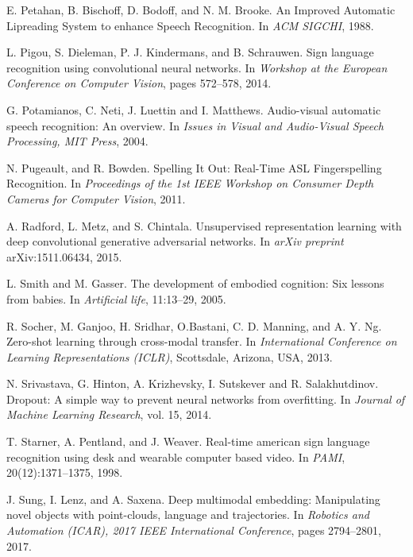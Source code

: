 \begin{thebibliography}{99}
  E. Petahan, B. Bischoff, D. Bodoff, and N. M. Brooke. An Improved
  Automatic Lipreading System to enhance Speech Recognition.
  In \textit{ACM SIGCHI}, 1988.

 L. Pigou, S. Dieleman, P. J. Kindermans, and B. Schrauwen.
  Sign language recognition using convolutional neural networks. In
  \textit{Workshop at the European Conference on Computer Vision},
  pages 572--578, 2014.

  G. Potamianos, C. Neti, J. Luettin and  I. Matthews. Audio-visual
  automatic speech recognition: An overview. In \textit{Issues in Visual
  and Audio-Visual Speech Processing, MIT Press}, 2004.

  N. Pugeault, and R. Bowden. Spelling It Out: Real-Time ASL
  Fingerspelling Recognition. In \textit{Proceedings of the 1st IEEE
  Workshop on Consumer Depth Cameras for Computer Vision}, 2011.

  A. Radford, L. Metz, and S. Chintala. Unsupervised representation
  learning with deep convolutional generative adversarial networks. In 
  \textit{arXiv preprint} arXiv:1511.06434, 2015.

  L. Smith and M. Gasser. The development of embodied cognition:
  Six lessons from babies. In \textit{Artificial life}, 11:13--29, 2005.

  R. Socher, M. Ganjoo, H. Sridhar, O.Bastani, C. D. Manning, and
  A. Y. Ng. Zero-shot learning through cross-modal transfer.
  In \textit{International Conference on Learning Representations (ICLR)},
  Scottsdale, Arizona, USA, 2013.

  N. Srivastava, G. Hinton, A. Krizhevsky, I. Sutskever and R. Salakhutdinov.
  Dropout: A simple way to prevent neural networks from overfitting. In
  \textit{Journal of Machine Learning Research}, vol. 15, 2014.

  T. Starner, A. Pentland, and J. Weaver. Real-time american sign language
  recognition using desk and wearable computer based video. 
  In \textit{PAMI}, 20(12):1371–1375, 1998.

  J. Sung, I. Lenz, and A. Saxena. Deep multimodal embedding:
  Manipulating novel objects with point-clouds, language and trajectories.
  In \textit{Robotics and Automation (ICAR), 2017 IEEE International
  Conference}, pages 2794--2801, 2017.


\end{thebibliography}
